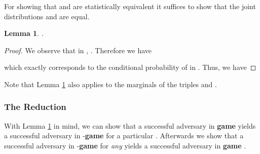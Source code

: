 \documentclass[10pt]{extarticle}
\newtheorem{Lem}[Thm]{Lemma}
\begin{document}
For showing that  and  are statistically equivalent it suffices to show that the joint distributions  and  are equal.

\begin{Lem}\label{EXPEQUIV} .
\end{Lem}
\begin{proof}
We observe that in , . Therefore we have

which exactly corresponds to the conditional probability of  in . Thus, we have

\end{proof}

\noindent Note that Lemma \ref{EXPEQUIV} also applies to the marginals of the triples  and .

\subsubsection{The Reduction}

With Lemma \ref{EXPEQUIV} in mind, we can show that a successful adversary in \textbf{game}  yields a successful adversary in -\textbf{game}  for a particular . Afterwards we show that a successful adversary in -\textbf{game}  for \textit{any}  yields a successful adversary in \textbf{game} .
\end{document}
